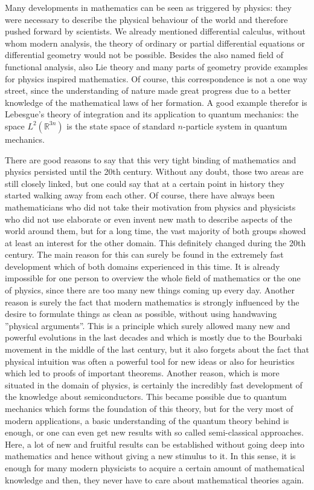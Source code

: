 Many developments in mathematics can be seen as triggered by physics: they were necessary to describe the physical behaviour of the world and therefore pushed forward by scientists. We already mentioned differential calculus, without whom modern analysis, the theory of ordinary or partial differential equations or differential geometry would not be possible. Besides the also named field of functional analysis, also Lie theory and many parts of geometry provide examples for physics inspired mathematics. Of course, this correspondence is not a one way street, since the understanding of nature made great progress due to a better knowledge of the mathematical laws of her formation. A good example therefor is Lebesgue's theory of integration and its application to quantum mechanics: the space $L^2(\mathbb{R}^{3n})$ is the state space of standard $n$-particle system in quantum mechanics.


There are good reasons to say that this very tight binding of mathematics and physics persisted until the 20th century. Without any doubt, those two areas are still closely linked, but one could say that at a certain point in history they started walking away from each other. Of course, there have always been mathematicians who did not take their motivation from physics and physicists who did not use elaborate or even invent new math to describe aspects of the world around them, but for a long time, the vast majority of both groups showed at least an interest for the other domain. This definitely changed during the 20th century. The main reason for this can surely be found in the extremely fast development which of both domains experienced in this time. It is already impossible for one person to overview the whole field of mathematics or the one of physics, since there are too many new things coming up every day. Another reason is surely the fact that modern mathematics is strongly influenced by the desire to formulate things as clean as possible, without using handwaving ''physical arguments''. This is a principle which surely allowed many new and powerful evolutions in the last decades and which is mostly due to the Bourbaki movement in the middle of the last century, but it also forgets about the fact that physical intuition was often a powerful tool for new ideas or also for heuristics which led to proofs of important theorems. Another reason, which is more situated in the domain of physics, is certainly the incredibly fast development of the knowledge about semiconductors. This became possible due to quantum mechanics which forms the foundation of this theory, but for the very most of modern applications, a basic understanding of the quantum theory behind is enough, or one can even get new results with so called semi-classical approaches. Here, a lot of new and fruitful results can be established without going deep into mathematics and hence without giving a new stimulus to it. In this sense, it is enough for many modern physicists to acquire a certain amount of mathematical knowledge and then, they never have to care about mathematical theories again.


